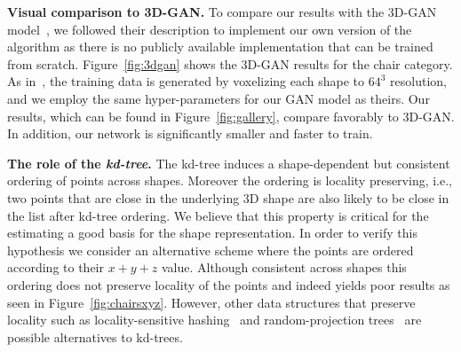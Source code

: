 \vspace{12pt}
\noindent \textbf{Visual comparison to 3D-GAN.} To compare our results with the 3D-GAN model~\cite{wu2016learning}, we followed their description to implement our own version of the algorithm as there is no publicly available implementation that can be trained from scratch. Figure~\ref{fig:3dgan} shows the 3D-GAN results for the chair category. As in~\cite{wu2016learning}, the training data is generated by voxelizing each shape to $64^3$ resolution, and we employ the same hyper-parameters for our GAN model as theirs. Our results, which can be found in Figure~\ref{fig:gallery}, compare favorably to 3D-GAN. In addition, our network is significantly smaller and faster to train.



\vspace{12pt}
\noindent \textbf{The role of the \emph{kd-tree}.} The kd-tree induces a shape-dependent but consistent ordering of points across shapes. Moreover the ordering is locality preserving, i.e., two points that are close in the underlying 3D shape are also likely to be close in the list after kd-tree ordering. We believe that this property is critical for the estimating a good basis for the shape representation. In order to verify this hypothesis we consider an alternative scheme where the points are ordered according to their $x+y+z$ value. Although consistent across shapes this ordering does not preserve locality of the points and indeed yields poor results as seen in Figure~\ref{fig:chairsxyz}. However, other data structures that preserve locality such as locality-sensitive hashing~\cite{gionis1999similarity} and random-projection trees~\cite{dasgupta2008random} are possible alternatives to kd-trees.

